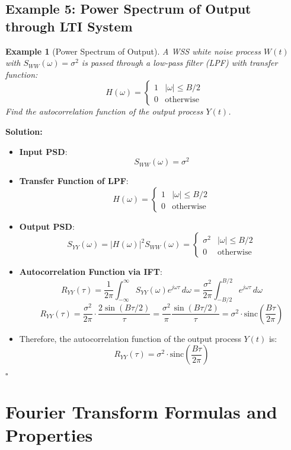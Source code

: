 \documentclass[12pt]{article}
\newtheorem{example}{Example}
\newenvironment{solution}{\noindent\textbf{Solution:}}{\hfill$\square$}
\begin{document}
\subsection{Example 5: Power Spectrum of Output through LTI System}
\begin{example}[Power Spectrum of Output]
A WSS white noise process \( W(t) \) with \( S_{WW}(\omega) = \sigma^2 \) is passed through a low-pass filter (LPF) with transfer function:
\[
H(\omega) = 
\begin{cases}
1 & |\omega| \leq B/2 \\
0 & \text{otherwise}
\end{cases}
\]
Find the autocorrelation function of the output process \( Y(t) \).
\end{example}
\begin{solution}
\begin{itemize}
    \item \textbf{Input PSD}:
    \[
    S_{WW}(\omega) = \sigma^2
    \]
    \item \textbf{Transfer Function of LPF}:
    \[
    H(\omega) = 
    \begin{cases}
    1 & |\omega| \leq B/2 \\
    0 & \text{otherwise}
    \end{cases}
    \]
    \item \textbf{Output PSD}:
    \[
    S_{YY}(\omega) = |H(\omega)|^2 S_{WW}(\omega) = 
    \begin{cases}
    \sigma^2 & |\omega| \leq B/2 \\
    0 & \text{otherwise}
    \end{cases}
    \]
    \item \textbf{Autocorrelation Function via IFT}:
    \[
    R_{YY}(\tau) = \frac{1}{2\pi} \int_{-\infty}^{\infty} S_{YY}(\omega) e^{j\omega \tau} \, d\omega = \frac{\sigma^2}{2\pi} \int_{-B/2}^{B/2} e^{j\omega \tau} \, d\omega
    \]
    \[
    R_{YY}(\tau) = \frac{\sigma^2}{2\pi} \cdot \frac{2 \sin(B\tau/2)}{\tau} = \frac{\sigma^2}{\pi} \frac{\sin(B\tau/2)}{\tau} = \sigma^2 \cdot \text{sinc}\left(\frac{B\tau}{2\pi}\right)
    \]
    \item Therefore, the autocorrelation function of the output process \( Y(t) \) is:
    \[
    R_{YY}(\tau) = \sigma^2 \cdot \text{sinc}\left(\frac{B\tau}{2\pi}\right)
    \]
\end{itemize}
\end{solution}

\section{Fourier Transform Formulas and Properties}
\end{document}
